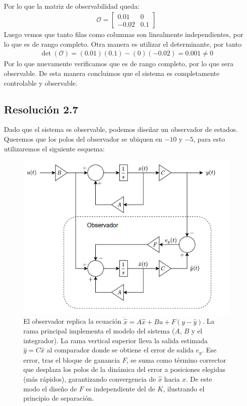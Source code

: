 \documentclass[
  11pt,
  letterpaper,
   addpoints,
   answers
  ]{exam}
\begin{document}
\begin{solution}
\begin{align}
\end{align}
Por lo que la matriz de observabilidad queda:
\begin{align}
\mathcal{O} = \begin{bmatrix} 0.01 & 0 \\ -0.02 & 0.1 \end{bmatrix}
\end{align}
Luego vemos que tanto filas como columnas son linealmente independientes, por lo que es de rango completo. Otra manera es utilizar el determinante, por tanto
\begin{align}
\det(\mathcal{O}) = (0.01)(0.1) - (0)(-0.02) = 0.001 \neq 0
\end{align}
Por lo que nuevamente verificamos que es de rango completo, por lo que sera observable. De esta manera concluimos que el sistema es completamente controlable y observable.
\subsection*{Resolución 2.7}
Dado que el sistema es observable, podemos diseñar un observador de estados. Queremos que los polos del observador se ubiquen en $-10$ y $-5$, para esto utilizaremos el siguiente esquema:
  \begin{figure}[H]\centering
    \includegraphics[width=.6\textwidth]{../figures/Auxiliar_4_3.png}
    \caption{El observador replica la ecuación $\dot{\hat x}=A\hat x + Bu + F(y-\hat y)$. La rama principal implementa el modelo del sistema ($A$, $B$ y el integrador). La rama vertical superior lleva la salida estimada $\hat y = C\hat x$ al comparador donde se obtiene el error de salida $e_y$. Ese error, tras el bloque de ganancia $F$, se suma como término corrector que desplaza los polos de la dinámica del error a posiciones elegidas (más rápidos), garantizando convergencia de $\hat x$ hacia $x$. De este modo el diseño de $F$ es independiente del de $K$, ilustrando el principio de separación.}
  \end{figure}


\end{solution}
\end{document}
